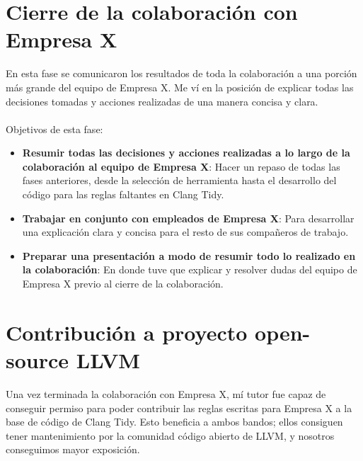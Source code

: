 \documentclass[12pt]{extreport} %
\begin{document}
\section{Cierre de la colaboración con Empresa X}

En esta fase se comunicaron los resultados de toda la colaboración a
una porción más grande del equipo de Empresa X. Me ví en la posición de
explicar todas las decisiones tomadas y acciones realizadas de una
manera concisa y clara.

\paragraph{}
Objetivos de esta fase:
\begin{itemize}
\item \textbf{Resumir todas las decisiones y acciones realizadas a lo
  largo de la colaboración al equipo de Empresa X}: Hacer un repaso de
  todas las fases anteriores, desde la selección de herramienta hasta
  el desarrollo del código para las reglas faltantes en Clang Tidy.
\item \textbf{Trabajar en conjunto con empleados de Empresa X}: Para
  desarrollar una explicación clara y concisa para el resto de sus
  compañeros de trabajo.
\item \textbf{Preparar una presentación a modo de resumir todo lo
  realizado en la colaboración}: En donde tuve que explicar y resolver
  dudas del equipo de Empresa X previo al cierre de la colaboración.
\end{itemize}

\section{Contribución a proyecto open-source LLVM}

Una vez terminada la colaboración con Empresa X, mí tutor fue capaz de
conseguir permiso para poder contribuir las reglas escritas para
Empresa X a la base de código de Clang Tidy. Esto beneficia a ambos
bandos; ellos consiguen tener mantenimiento por la comunidad código
abierto de LLVM, y nosotros conseguimos mayor exposición.
\end{document}
